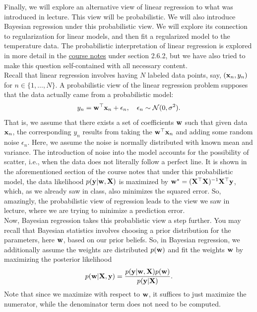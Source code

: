 \documentclass[submit]{../harvardml}
\begin{document}
\newpage

\begin{problem}
    Finally, we will explore an alternative view of linear regression to what was introduced in lecture. This view will be probabilistic. We will also introduce Bayesian regression under this probabilistic view. We will explore its connection to regularization for linear models, and then fit a regularized model to the temperature data. The probabilistic interpretation of linear regression is explored in more detail in the \href{https://github.com/harvard-ml-courses/cs181-textbook/blob/master/Textbook.pdf}{course notes} under section 2.6.2, but we have also tried to make this question self-contained with all necessary content.
    \\
    
    \noindent Recall that linear regression involves having $N$ labeled data points, say, $(\mathbf{x}_n,y_n)$ for $n\in\{1,\dots,N\}$. A probabilistic view of the linear regression problem supposes that the data actually came from a probabilistic model:
    \[y_n = \mathbf{w}^\top\mathbf{x}_n + \epsilon_n, \quad \epsilon_n \sim \mathcal{N}(0, \sigma^2).\]
    That is, we assume that there exists a set of coefficients $\mathbf{w}$ such that given data $\mathbf{x}_n$, the corresponding $y_n$ results from taking the $\mathbf{w}^\top\mathbf{x}_n$ and adding some random noise $\epsilon_n$. Here, we assume the noise is normally distributed with known mean and variance. The introduction of noise into the model accounts for the possibility of scatter, i.e., when the data does not literally follow a perfect line. It is shown in the aforementioned section of the course notes that under this probabilistic model, the data likelihood $p(\mathbf{y}|\mathbf{w},\mathbf{X})$ is maximized by $\mathbf{w}^* = (\mathbf{X}^\top\mathbf{X})^{-1} \mathbf{X}^\top \mathbf{y}$, which, as we already saw in class, also minimizes the squared error. So, amazingly, the probabilistic view of regression leads to the view we saw in lecture, where we are trying to minimize a prediction error. \\
    
    \noindent Now, Bayesian regression takes this probablistic view a step further. You may recall that Bayesian statistics involves choosing a prior distribution for the parameters, here $\mathbf{w}$, based on our prior beliefs. So, in Bayesian regression, we additionally assume the weights are distributed $p(\mathbf{w})$ and fit the weights $\mathbf{w}$ by maximizing the posterior likelihood
    \[ p(\mathbf{w} | \mathbf{X}, \mathbf{y}) = \frac{p(\bold y | \mathbf{w}, \mathbf{X})p(\mathbf{w})}{p(\mathbf{y} | \mathbf{X})}. \]
    Note that since we maximize with respect to $\mathbf{w}$, it suffices to just maximize the numerator, while the denominator term does not need to be computed.
    

\end{problem}
\end{document}
